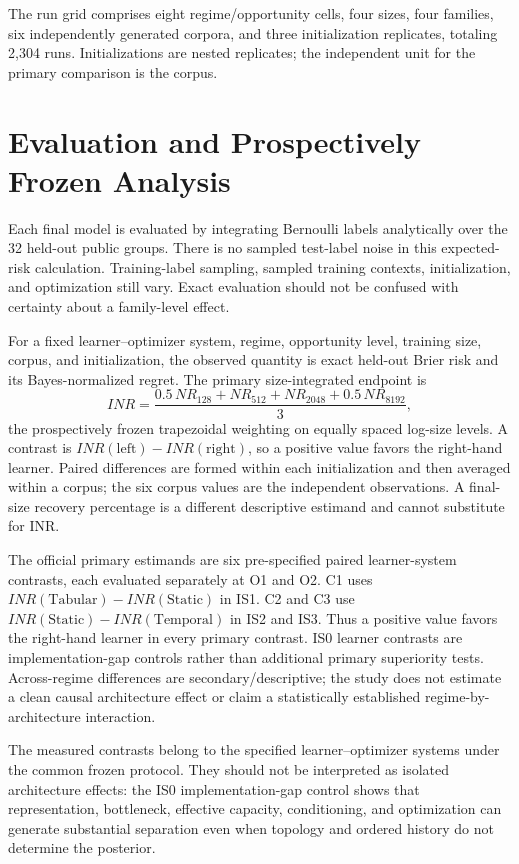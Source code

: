 \documentclass[11pt]{article}
\begin{document}
The run grid comprises eight regime/opportunity cells, four sizes, four families, six independently generated corpora, and three initialization replicates, totaling 2,304 runs. Initializations are nested replicates; the independent unit for the primary comparison is the corpus.

\section{Evaluation and Prospectively Frozen Analysis}

Each final model is evaluated by integrating Bernoulli labels analytically over the 32 held-out public groups. There is no sampled test-label noise in this expected-risk calculation. Training-label sampling, sampled training contexts, initialization, and optimization still vary. Exact evaluation should not be confused with certainty about a family-level effect.

For a fixed learner--optimizer system, regime, opportunity level, training size, corpus, and initialization, the observed quantity is exact held-out Brier risk and its Bayes-normalized regret. The primary size-integrated endpoint is
\[
INR=\frac{0.5\,NR_{128}+NR_{512}+NR_{2048}+0.5\,NR_{8192}}{3},
\]
the prospectively frozen trapezoidal weighting on equally spaced log-size levels. A contrast is $INR(\mathrm{left})-INR(\mathrm{right})$, so a positive value favors the right-hand learner. Paired differences are formed within each initialization and then averaged within a corpus; the six corpus values are the independent observations. A final-size recovery percentage is a different descriptive estimand and cannot substitute for INR.

The official primary estimands are six pre-specified paired learner-system contrasts, each evaluated separately at O1 and O2. C1 uses $INR(\mathrm{Tabular})-INR(\mathrm{Static})$ in IS1. C2 and C3 use $INR(\mathrm{Static})-INR(\mathrm{Temporal})$ in IS2 and IS3. Thus a positive value favors the right-hand learner in every primary contrast. IS0 learner contrasts are implementation-gap controls rather than additional primary superiority tests. Across-regime differences are secondary/descriptive; the study does not estimate a clean causal architecture effect or claim a statistically established regime-by-architecture interaction.

The measured contrasts belong to the specified learner--optimizer systems under the common frozen protocol. They should not be interpreted as isolated architecture effects: the IS0 implementation-gap control shows that representation, bottleneck, effective capacity, conditioning, and optimization can generate substantial separation even when topology and ordered history do not determine the posterior.
\end{document}
